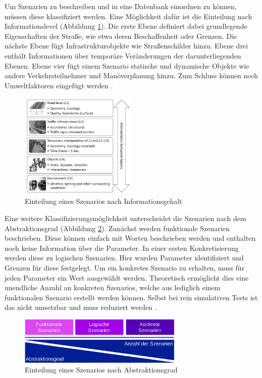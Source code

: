 Um Szenarien zu beschreiben und in eine Datenbank einordnen zu können, müssen diese klassifiziert werden. Eine Möglichkeit dafür ist die Einteilung nach Informationslevel (Abbildung \ref{fig:layer_model}). Die erste Ebene definiert dabei grundlegende Eigenschaften der Straße, wie etwa deren Beschaffenheit oder Grenzen. Die nächste Ebene fügt Infrastrukturobjekte wie Straßenschilder hinzu. Ebene drei enthält Informationen über temporäre Veränderungen der darunterliegenden Ebenen. Ebene vier fügt einem Szenario statische und dynamische Objekte wie andere Verkehrsteilnehmer und Manöverplanung hinzu. Zum Schluss können noch Umweltfaktoren eingefügt werden \cite{Nalic2020,Bagschik2018}.
\begin{figure}[H]
    \centering
    \includegraphics[width=0.5\textwidth]{figures/2_Grundlagen/layer_model.png}
    \caption{Einteilung eines Szenarios nach Informationsgehalt \cite{Bagschik2018}}
    \label{fig:layer_model}
\end{figure}

Eine weitere Klassifizierungsmöglichkeit unterscheidet die Szenarien nach dem Abstraktionsgrad (Abbildung \ref{fig:scenario_level}). Zunächst werden funktionale Szenarien beschrieben. Diese können einfach mit Worten beschrieben werden und enthalten noch keine Information über die Parameter. In einer ersten Konkretisierung  werden diese zu logischen Szenarien. Hier wurden Parameter identifiziert und Grenzen für diese festgelegt. Um ein konkretes Szenario zu erhalten, muss für jeden Parameter ein Wert ausgewählt werden. Theoretisch ermöglicht dies eine unendliche Anzahl an konkreten Szenarios, welche aus lediglich einem funktionalen Szenario erstellt werden können. Selbst bei rein simulativen Tests ist das nicht umsetzbar und muss reduziert werden \cite{Nalic2020, menzel2018scenarios}.
\begin{figure}[H]
    \centering
    \includegraphics[width=0.7\textwidth]{figures/2_Grundlagen/scenario_level.pdf}
    \caption{Einteilung eines Szenarios nach Abstraktionsgrad \cite{menzel2018scenarios}}
    \label{fig:scenario_level}
\end{figure}

